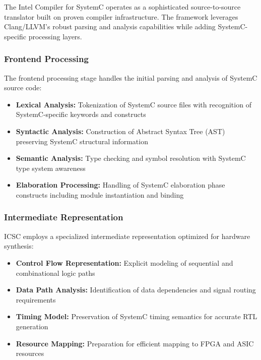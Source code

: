 The Intel Compiler for SystemC operates as a sophisticated source-to-source translator built on proven compiler infrastructure. The framework leverages Clang/LLVM's robust parsing and analysis capabilities while adding SystemC-specific processing layers.

\subsubsection{Frontend Processing}
\label{subsubsec:frontend_processing}

The frontend processing stage handles the initial parsing and analysis of SystemC source code:

\begin{itemize}
\item \textbf{Lexical Analysis:} Tokenization of SystemC source files with recognition of SystemC-specific keywords and constructs
\item \textbf{Syntactic Analysis:} Construction of Abstract Syntax Tree (AST) preserving SystemC structural information
\item \textbf{Semantic Analysis:} Type checking and symbol resolution with SystemC type system awareness
\item \textbf{Elaboration Processing:} Handling of SystemC elaboration phase constructs including module instantiation and binding
\end{itemize}

\subsubsection{Intermediate Representation}
\label{subsubsec:intermediate_representation}

ICSC employs a specialized intermediate representation optimized for hardware synthesis:

\begin{itemize}
\item \textbf{Control Flow Representation:} Explicit modeling of sequential and combinational logic paths
\item \textbf{Data Path Analysis:} Identification of data dependencies and signal routing requirements
\item \textbf{Timing Model:} Preservation of SystemC timing semantics for accurate RTL generation
\item \textbf{Resource Mapping:} Preparation for efficient mapping to FPGA and ASIC resources
\end{itemize}

